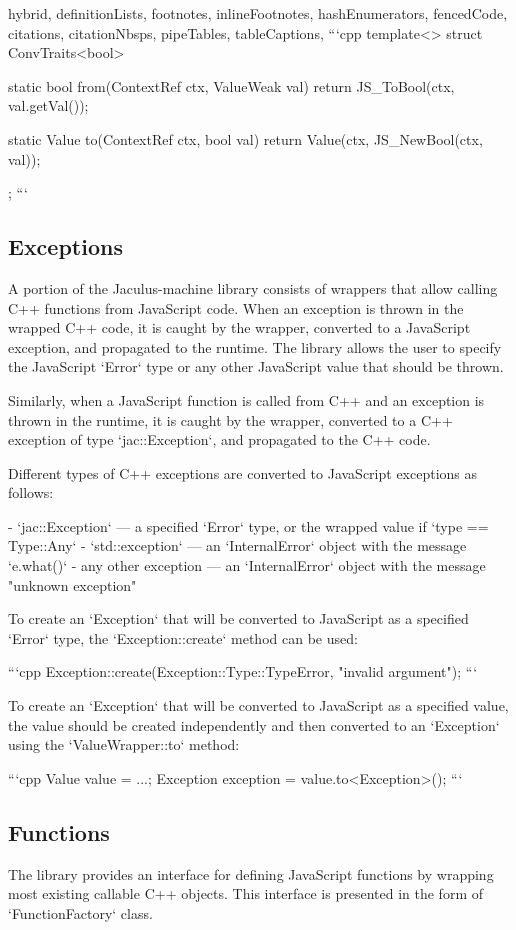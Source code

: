 \begin{markdown*}{%
  hybrid,
  definitionLists,
  footnotes,
  inlineFootnotes,
  hashEnumerators,
  fencedCode,
  citations,
  citationNbsps,
  pipeTables,
  tableCaptions,
}
```cpp
template<>
struct ConvTraits<bool> {
  static bool from(ContextRef ctx, ValueWeak val) {
    return JS_ToBool(ctx, val.getVal());
  }

  static Value to(ContextRef ctx, bool val) {
    return Value(ctx, JS_NewBool(ctx, val));
  }
};
```

\subsection{Exceptions}

A portion of the Jaculus-machine library consists of wrappers that allow calling C++ functions from JavaScript code. When an exception is thrown in the wrapped C++ code, it is caught by the wrapper, converted to a JavaScript exception, and propagated to the runtime. The library allows the user to specify the JavaScript `Error` type or any other JavaScript value that should be thrown.

Similarly, when a JavaScript function is called from C++ and an exception is thrown in the runtime, it is caught by the wrapper, converted to a C++ exception of type `jac::Exception`, and propagated to the C++ code.

Different types of C++ exceptions are converted to JavaScript exceptions as follows:

  - `jac::Exception` --- a specified `Error` type, or the wrapped value if `type == Type::Any`
  - `std::exception` --- an `InternalError` object with the message `e.what()`
  - any other exception --- an `InternalError` object with the message "unknown exception"

To create an `Exception` that will be converted to JavaScript as a specified `Error` type, the `Exception::create` method can be used:

```cpp
Exception::create(Exception::Type::TypeError, "invalid argument");
```

To create an `Exception` that will be converted to JavaScript as a specified value, the value should be created independently and then converted to an `Exception` using the `ValueWrapper::to` method:

```cpp
Value value = ...;
Exception exception = value.to<Exception>();
```

\subsection{Functions}

The library provides an interface for defining JavaScript functions by wrapping most existing callable C++ objects. This interface is presented in the form of `FunctionFactory` class.


\end{markdown*}
